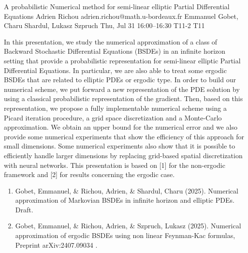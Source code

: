 \begin{talk}
  {A probabilistic Numerical method for semi-linear elliptic Partial Differential Equations}%
  {Adrien Richou}%
  {adrien.richou@math.u-bordeaux.fr}%
  {Emmanuel Gobet, Charu Shardul, Lukasz Szpruch}%
  {}%
  {}%
  {Thu, Jul 31 16:00--16:30}%
  {T11-2}%
  {T11}%
  
    
   
In this presentation, we study the numerical approximation of a class of Backward Stochastic Differential Equations (BSDEs) in an infinite horizon setting that provide a probabilistic representation for semi-linear elliptic Partial Differential Equations. In particular, we are also able to treat some ergodic BSDEs that are related to elliptic PDEs or ergodic type. In order to build our numerical scheme, we put forward a new representation of the PDE solution by using a classical probabilistic representation of the gradient. Then, based on this representation, we propose a fully implementable numerical scheme using a Picard iteration procedure, a grid space discretization and a Monte-Carlo approximation. We obtain an upper bound for the numerical error and we also provide some numerical experiments that show the
efficiency of this approach for small dimensions. Some numerical experiments also show that it is possible to efficiently handle larger dimensions by replacing grid-based spatial discretization with neural networks. This presentation is based on [1] for the non-ergodic framework and [2] for results concerning the ergodic case.

\medskip

\begin{enumerate}
 \item[{[1]}] Gobet, Emmanuel, \& Richou, Adrien, \& Shardul, Charu (2025). Numerical approximation of Markovian BSDEs in infinite
  horizon and elliptic PDEs. Draft.
 \item[{[2]}] Gobet, Emmanuel, \& Richou, Adrien, \& Szpruch, Lukasz (2025).  Numerical approximation of ergodic BSDEs using non
  linear Feynman-Kac formulas, Preprint arXiv:2407.09034 .
\end{enumerate}

\end{talk}

